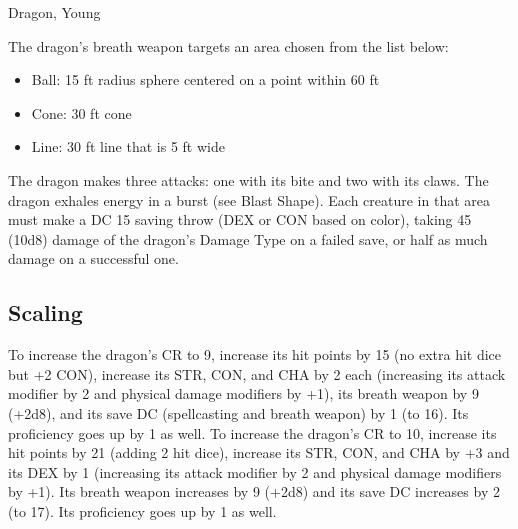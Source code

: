 \begin{DndMonster}[float*=b,width=\textwidth + 8pt]{Dragon, Young}
\begin{multicols}{2}
 The dragon's breath weapon targets an area chosen from the list below:
\begin{itemize}
	\item[] Ball: 15 ft radius sphere centered on a point within 60 ft
	\item[] Cone: 30 ft cone
	\item[] Line: 30 ft line that is 5 ft wide
\end{itemize}

 The dragon makes three attacks: one with its bite and two with its claws.
\DndMonsterAttack[
	name=Bite,
	distance=melee,
	type=weapon,
	mod=+8,
	reach=10,
	dmg=\DndDice{2d10 + 5},
	dmg-type=piercing,
	extra={ plus 4 (1d8) damage of the dragon's Damage Type.}
]
\DndMonsterAttack[
	name=Claw,
	distance=melee,
	type=weapon,
	mod=+8,
	reach=5,
	dmg=\DndDice{2d6 + 5},
	dmg-type=slashing
]
The dragon exhales energy in a burst (see Blast Shape). Each creature in that area must make a DC 15 saving throw (DEX or CON based on color), taking 45 (10d8) damage of the dragon's Damage Type on a failed save, or half as much damage on a successful one.
\subsection{Scaling}
To increase the dragon's CR to 9, increase its hit points by 15 (no extra hit dice but +2 CON), increase its STR, CON, and CHA by 2 each (increasing its attack modifier by 2 and physical damage modifiers by +1), its breath weapon by 9 (+2d8), and its save DC (spellcasting and breath weapon) by 1 (to 16). Its proficiency goes up by 1 as well.
To increase the dragon's CR to 10, increase its hit points by 21 (adding 2 hit dice), increase its STR, CON, and CHA by +3 and its DEX by 1 (increasing its attack modifier by 2 and physical damage modifiers by +1). Its breath weapon increases by 9 (+2d8) and its save DC increases by 2 (to 17). Its proficiency goes up by 1 as well.
\end{multicols}
\end{DndMonster}
